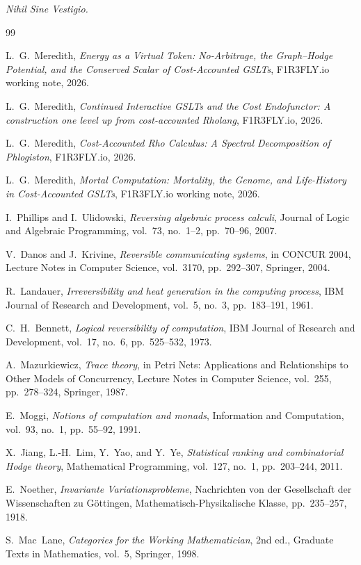 \documentclass[11pt]{article}
\theoremstyle{definition}
\theoremstyle{plain}
\theoremstyle{remark}
\begin{document}
\bigskip
\noindent\emph{Nihil Sine Vestigio.}

\begin{thebibliography}{99}

 L.~G.~Meredith, \emph{Energy as a Virtual Token: No-Arbitrage, the Graph--Hodge
Potential, and the Conserved Scalar of Cost-Accounted GSLTs}, F1R3FLY.io working note, 2026.

 L.~G.~Meredith, \emph{Continued Interactive GSLTs and the Cost Endofunctor: A
construction one level up from cost-accounted Rholang}, F1R3FLY.io, 2026.

 L.~G.~Meredith, \emph{Cost-Accounted Rho Calculus: A Spectral Decomposition of
Phlogiston}, F1R3FLY.io, 2026.

 L.~G.~Meredith, \emph{Mortal Computation: Mortality, the Genome, and Life-History in
Cost-Accounted GSLTs}, F1R3FLY.io working note, 2026.

 I.~Phillips and I.~Ulidowski, \emph{Reversing algebraic process calculi}, Journal of
Logic and Algebraic Programming, vol.~73, no.~1--2, pp.~70--96, 2007.

 V.~Danos and J.~Krivine, \emph{Reversible communicating systems}, in CONCUR 2004,
Lecture Notes in Computer Science, vol.~3170, pp.~292--307, Springer, 2004.

 R.~Landauer, \emph{Irreversibility and heat generation in the computing process},
IBM Journal of Research and Development, vol.~5, no.~3, pp.~183--191, 1961.

 C.~H.~Bennett, \emph{Logical reversibility of computation}, IBM Journal of
Research and Development, vol.~17, no.~6, pp.~525--532, 1973.

 A.~Mazurkiewicz, \emph{Trace theory}, in Petri Nets: Applications and
Relationships to Other Models of Concurrency, Lecture Notes in Computer Science, vol.~255,
pp.~278--324, Springer, 1987.

 E.~Moggi, \emph{Notions of computation and monads}, Information and Computation,
vol.~93, no.~1, pp.~55--92, 1991.

 X.~Jiang, L.-H.~Lim, Y.~Yao, and Y.~Ye, \emph{Statistical ranking and combinatorial
Hodge theory}, Mathematical Programming, vol.~127, no.~1, pp.~203--244, 2011.

 E.~Noether, \emph{Invariante Variationsprobleme}, Nachrichten von der
Gesellschaft der Wissenschaften zu G\"ottingen, Mathematisch-Physikalische Klasse, pp.~235--257,
1918.

 S.~Mac~Lane, \emph{Categories for the Working Mathematician}, 2nd ed., Graduate
Texts in Mathematics, vol.~5, Springer, 1998.

\end{thebibliography}
\end{document}
